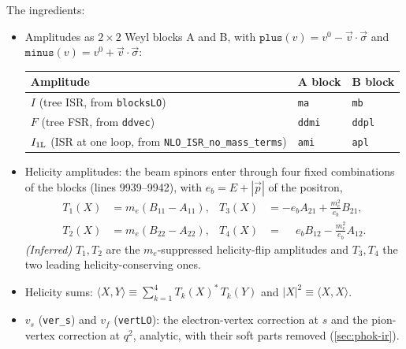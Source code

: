 \documentclass[11pt,a4paper]{article}
\newcommand{\code}[1]{\texttt{#1}}
\begin{document}
The ingredients:
\begin{itemize}
\item Amplitudes as $2\times2$ Weyl blocks A and B, with
  $\code{plus}(v)=v^0-\vec v\cdot\vec\sigma$ and $\code{minus}(v)=v^0+\vec v\cdot\vec\sigma$:
\begin{center}\small
\begin{tabular}{@{}lll@{}}
\toprule
Amplitude & A block & B block \\
\midrule
$I$ (tree ISR, from \code{blocksLO}) & \code{ma} & \code{mb} \\
$F$ (tree FSR, from \code{ddvec})    & \code{ddmi} & \code{ddpl} \\
$I_{\rm 1L}$ (ISR at one loop, from \code{NLO\_ISR\_no\_mass\_terms}) & \code{ami} & \code{apl} \\
\bottomrule
\end{tabular}
\end{center}
\item Helicity amplitudes: the beam spinors enter through four fixed combinations of the blocks
  (lines 9939--9942), with $e_b=E+|\vec p|$ of the positron,
\begin{align*}
T_1(X)&=m_e(B_{11}-A_{11}), & T_3(X)&=-e_b A_{21}+\tfrac{m_e^2}{e_b}B_{21},\\
T_2(X)&=m_e(B_{22}-A_{22}), & T_4(X)&=\phantom{-}e_b B_{12}-\tfrac{m_e^2}{e_b}A_{12}.
\end{align*}
  \emph{(Inferred)} $T_1,T_2$ are the $m_e$-suppressed helicity-flip amplitudes and $T_3,T_4$
  the two leading helicity-conserving ones.
\item Helicity sums: $\langle X,Y\rangle\equiv\sum_{k=1}^4T_k(X)^*\,T_k(Y)$ and
  $|X|^2\equiv\langle X,X\rangle$.
\item $v_s$ (\code{ver\_s}) and $v_f$ (\code{vertLO}): the electron-vertex correction at $s$ and
  the pion-vertex correction at $q^2$, analytic, with their soft parts removed
  (\cref{sec:phok-ir}).
\end{itemize}
\end{document}
